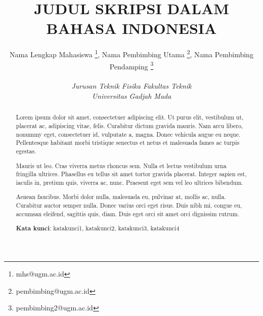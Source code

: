 \documentclass[a4paper,10pt]{article}
\title{\textbf{
JUDUL SKRIPSI DALAM BAHASA INDONESIA
}}
\author{
Nama Lengkap Mahasiswa \thanks{mhs@ugm.ac.id}, 
Nama Pembimbing Utama \thanks{pembimbing@ugm.ac.id}, 
Nama Pembimbing Pendamping \thanks{pembimbing2@ugm.ac.id} \\ \\ 
\textit{Jurusan Teknik Fisika Fakultas Teknik} \\ \textit{Universitas Gadjah Mada}}
\date{ }
\begin{document}
\maketitle

\begin{abstract}
    


Lorem ipsum dolor sit amet, consectetuer adipiscing elit. Ut purus elit, vestibulum ut,
placerat ac, adipiscing vitae, felis. Curabitur dictum gravida mauris. Nam arcu libero, nonummy
eget, consectetuer id, vulputate a, magna. Donec vehicula augue eu neque. Pellentesque habitant
morbi tristique senectus et netus et malesuada fames ac turpis egestas.

Mauris ut leo. Cras viverra metus rhoncus sem. Nulla et lectus vestibulum urna fringilla
ultrices. Phasellus eu tellus sit amet tortor gravida placerat. Integer sapien est, iaculis in, pretium
quis, viverra ac, nunc. Praesent eget sem vel leo ultrices bibendum.

Aenean faucibus. Morbi dolor nulla, malesuada eu, pulvinar at, mollis ac, nulla. Curabitur
auctor semper nulla. Donec varius orci eget risus. Duis nibh mi, congue eu, accumsan eleifend,
sagittis quis, diam. Duis eget orci sit amet orci dignissim rutrum.

\vspace{0.5cm}
\textbf{Kata kunci}: katakunci1, katakunci2, katakunci3, katakunci4

\end{abstract}
\end{document}
